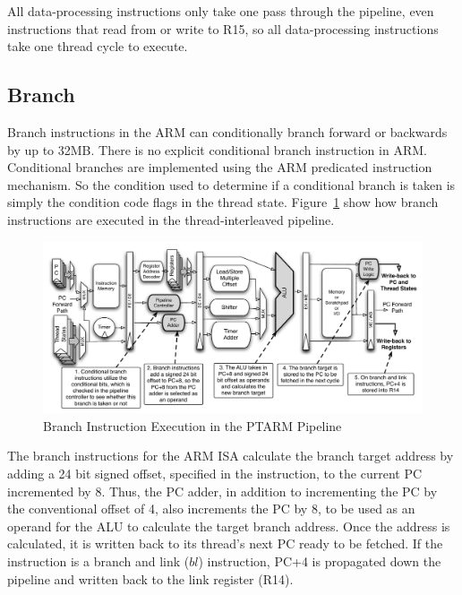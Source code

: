 All data-processing instructions only take one pass through the pipeline, even instructions that read from or write to R15, so all data-processing instructions take one thread cycle to execute. 
\subsection{Branch}
Branch instructions in the ARM can conditionally branch forward or backwards by up to 32MB.
There is no explicit conditional branch instruction in ARM.
Conditional branches are implemented using the ARM predicated instruction mechanism.
So the condition used to determine if a conditional branch is taken is simply the condition code flags in the thread state. 
Figure~\ref{fig:branch_pipeline_implementation} show how branch instructions are executed in the thread-interleaved pipeline.

\begin{figure}[h]
  \vspace{-15pt}
  \begin{center}
    \includegraphics[scale=.54]{figs/branch_pipeline_implementation}
  \end{center}
  \vspace{-3mm}
  \caption{Branch Instruction Execution in the PTARM Pipeline}
  \label{fig:branch_pipeline_implementation}
\end{figure}

The branch instructions for the ARM ISA calculate the branch target address by adding a 24 bit signed offset, specified in the instruction, to the current PC incremented by 8. 
Thus, the PC adder, in addition to incrementing the PC by the conventional offset of 4, also increments the PC by 8, to be used as an operand for the ALU to calculate the target branch address.
Once the address is calculated, it is written back to its thread's next PC ready to be fetched. 
If the instruction is a branch and link ($bl$) instruction, PC+4 is propagated down the pipeline and written back to the link register (R14).   

